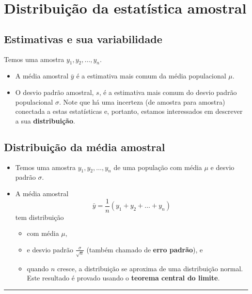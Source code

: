 \documentclass[]{article}
\providecommand{\tightlist}{%
  \setlength{\itemsep}{0pt}\setlength{\parskip}{0pt}}
\begin{document}
\section{Distribuição da estatística
amostral}\label{distribuicao-da-estatistica-amostral}

\subsection{Estimativas e sua
variabilidade}\label{estimativas-e-sua-variabilidade}

Temos uma amostra \(y_1,y_2,\ldots,y_n\).

\begin{itemize}
\tightlist
\item
  A média amostral \(\bar{y}\) é a estimativa mais comum da média
  populacional \(\mu\).
\item
  O desvio padrão amostral, \(s\), é a estimativa mais comum do desvio
  padrão populacional \(\sigma\). Note que há uma incerteza (de amostra
  para amostra) conectada a estas estatísticas e, portanto, estamos
  interessados em descrever a sua \textbf{distribuição}.
\end{itemize}

\subsection{Distribuição da média
amostral}\label{distribuicao-da-media-amostral}

\begin{itemize}
\tightlist
\item
  Temos uma amostra \(y_1,y_2,\ldots,y_n\) de uma população com média
  \(\mu\) e desvio padrão \(\sigma\).
\item
  A média amostral \[\bar{y}=\frac{1}{n}(y_1+y_2+\ldots+y_n)\] tem
  distribuição

  \begin{itemize}
  \tightlist
  \item
    com média \(\mu\),
  \item
    e desvio padrão \(\frac{\sigma}{\sqrt{n}}\) (também chamado de
    \textbf{erro padrão}), e
  \item
    quando \(n\) cresce, a distribuição se aproxima de uma distribuição
    normal. Este resultado é provado usando o \textbf{teorema central do
    limite}.
  \end{itemize}
\end{itemize}

\begin{center}\rule{0.5\linewidth}{\linethickness}\end{center}
\end{document}
